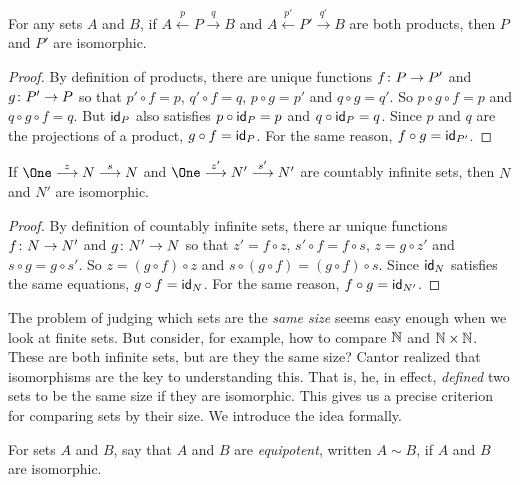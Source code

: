 \begin{lemma}
	For any sets $A$ and $B$, if $A\stackrel{p}{\longleftarrow}P\stackrel{q}{\longrightarrow}B$ and
	$A\stackrel{p'}{\longleftarrow}P'\stackrel{q'}{\longrightarrow}B$
	are both products, then $P$ and $P'$ are isomorphic.
	
	\begin{proof}
		By definition of products, there are unique functions ${f}\colon{P}\to{P'}$
		and ${g}\colon{P'}\to{P}$ so that $p'\circ f = p$, $q'\circ f=q$, 
		$p\circ g = p'$ and $q\circ g = q'$. So $p\circ g\circ f = p$
		and $q\circ g\circ f = q$. But $\textsf{id}_P$ also satisfies $p\circ \textsf{id}_P = p$
		and $q\circ \textsf{id}_P = q$. Since $p$ and $q$ are the projections of a product,
		$g\circ f = \textsf{id}_P$. For the same reason, $f\circ g = \textsf{id}_{P'}$.
	\end{proof}
\end{lemma}

\begin{lemma}
	If $\One\stackrel{z}{\longrightarrow}N\stackrel{s}{\longrightarrow}N$ and $\One\stackrel{z'}{\longrightarrow}N'\stackrel{s'}{\longrightarrow}N'$ are countably infinite sets, then $N$ and $N'$ are isomorphic. 
	
	\begin{proof}
		By definition of countably infinite sets, there ar unique functions ${f}\colon{N}\to{N'}$ and ${g}\colon{N'}\to{N}$ so that $z'= f\circ z$, $s'\circ f=f\circ s$, $z=g\circ z'$ and $s\circ g=g\circ s'$.
		So $z = (g\circ f)\circ z$ and $s\circ (g\circ f) = (g\circ f)\circ s$.
		Since $\textsf{id}_N$ satisfies the same equations, $g\circ f = \textsf{id}_N$. For the same reason, $f\circ g = \textsf{id}_{N'}$.
	\end{proof}
\end{lemma}

The problem of judging which sets are the \emph{same size} seems easy enough when we look at finite sets. But consider, for example, how to compare $\mathbb N$ and $\mathbb N\times \mathbb N$. These are both infinite sets, but are they the same size?
Cantor realized that isomorphisms are the key to understanding this. That is,
he, in effect, \emph{defined} two sets to be the same size if they are isomorphic.
This gives us a precise criterion for comparing sets by their size. We introduce the idea formally.

\begin{defn}
	For sets $A$ and $B$, say that $A$ and $B$ are \emph{equipotent}, written $A\sim B$, if $A$ and $B$ are isomorphic.
\end{defn}

